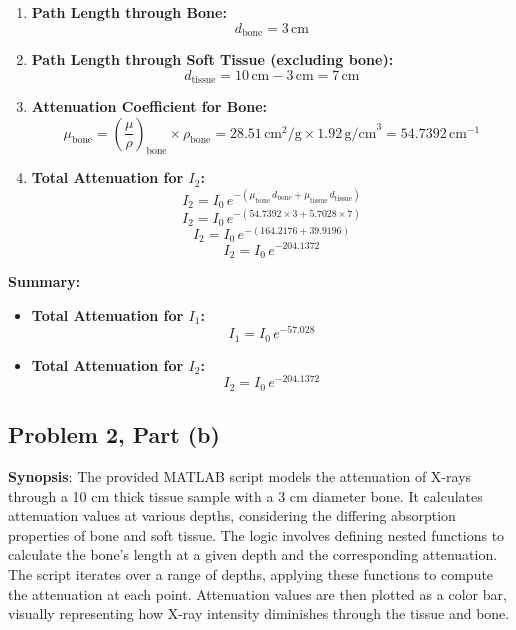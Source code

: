 \documentclass[12pt]{article}
\begin{document}
\begin{enumerate}
    \item \textbf{Path Length through Bone:}
    \[
    d_{\text{bone}} = 3 \, \text{cm}
    \]

    \item \textbf{Path Length through Soft Tissue (excluding bone):}
    \[
    d_{\text{tissue}} = 10 \, \text{cm} - 3 \, \text{cm} = 7 \, \text{cm}
    \]

    \item \textbf{Attenuation Coefficient for Bone:}
    \[
    \mu_{\text{bone}} = \left(\frac{\mu}{\rho}\right)_{\text{bone}} \times \rho_{\text{bone}} = 28.51 \, \text{cm}^2/\text{g} \times 1.92 \, \text{g/cm}^3 = 54.7392 \, \text{cm}^{-1}
    \]

    \item \textbf{Total Attenuation for $I_2$:}
    \[
    I_2 = I_0 \, e^{-(\mu_{\text{bone}} \, d_{\text{bone}} + \mu_{\text{tissue}} \, d_{\text{tissue}})}
    \]
    \[
    I_2 = I_0 \, e^{-(54.7392 \times 3 + 5.7028 \times 7)}
    \]
    \[
    I_2 = I_0 \, e^{-(164.2176 + 39.9196)}
    \]
    \[
    I_2 = I_0 \, e^{-204.1372}
    \]
\end{enumerate}

\textbf{Summary:}
\begin{itemize}
    \item \textbf{Total Attenuation for $I_1$:}
    \[
    I_1 = I_0 \, e^{-57.028}
    \]

    \item \textbf{Total Attenuation for $I_2$:}
    \[
    I_2 = I_0 \, e^{-204.1372}
    \]
\end{itemize}

\subsection*{Problem 2, Part (b)}
\textbf{Synopsis}:
The provided MATLAB script models the attenuation of X-rays through a 10 cm thick tissue sample with a 3 cm diameter bone. It calculates attenuation values at various depths, considering the differing absorption properties of bone and soft tissue. The logic involves defining nested functions to calculate the bone's length at a given depth and the corresponding attenuation. The script iterates over a range of depths, applying these functions to compute the attenuation at each point. Attenuation values are then plotted as a color bar, visually representing how X-ray intensity diminishes through the tissue and bone.
\end{document}
